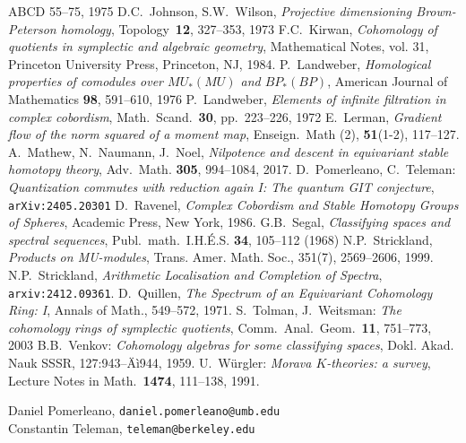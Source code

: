 \documentclass[11pt, reqno]{amsart}
\theoremstyle{plain}
\theoremstyle{definition}
\begin{document}
\begin{thebibliography}{ABCD}
	55--75, 1975
D.C.~Johnson, S.W.~Wilson, \emph{Projective dimensioning Brown-Peterson homology}, Topology~\textbf{12}, 327--353, 
1973
F.C.~Kirwan,  \emph{Cohomology of quotients in symplectic and algebraic geometry}, Mathematical
Notes, vol. 31, Princeton University Press, Princeton, NJ, 1984.
P.~Landweber, \emph{Homological properties of comodules over $MU_*(MU)$ and 
$BP_*(BP)$}, American Journal of Mathematics \textbf{98}, 591--610, 1976 
P.~Landweber, \emph{Elements of infinite filtration in complex cobordism}, 
Math.~Scand.~\textbf{30}, pp.~223--226, 1972 
E.~Lerman, \emph{Gradient flow of the norm squared of a moment map},  Enseign.~Math (2),  \textbf{51}(1-2),  117--127. 
A.~Mathew,  N.~Naumann,  J.~Noel,  \emph{Nilpotence and descent in equivariant stable homotopy theory},  Adv.~Math. 
\textbf{305}, 994--1084, 2017. 
D.~Pomerleano, C.~Teleman: \emph{Quantization commutes with reduction again I: The quantum GIT conjecture}, 
	\texttt{arXiv:2405.20301} 
D.~Ravenel,  \emph{Complex Cobordism and Stable Homotopy Groups of Spheres},  Academic Press, New York, 1986.
 G.B.~Segal, \emph{Classifying spaces and spectral sequences}, 
Publ.~math.~I.H.\'E.S. \textbf{34}, 105--112 (1968)
N.P.~Strickland,  \emph{Products on MU-modules}, Trans. Amer. Math. Soc., 351(7), 2569--2606, 1999.
N.P.~Strickland, \emph{Arithmetic Localisation and Completion of Spectra}, \texttt{arxiv:2412.09361}.
D.~Quillen,  \emph{The Spectrum of an Equivariant Cohomology Ring: I},  Annals of Math., 549--572,  1971.
S.~Tolman, J.~Weitsman: \emph{The cohomology rings of symplectic quotients}, Comm.~Anal.~Geom.~\textbf{11}, 
751--773, 2003
B.B.~Venkov: \emph{Cohomology algebras for some classifying spaces},  Dokl. Akad. Nauk SSSR, 127:943--Äì944, 1959.
U.~W{\"u}rgler:  \emph{Morava $K$-theories: a survey}, Lecture Notes in Math.~\textbf{1474}, 111--138, 1991.
\end{thebibliography}
\smallskip
\noindent
{\sc Daniel Pomerleano}, \texttt{daniel.pomerleano@umb.edu} 
\\
{\sc Constantin Teleman}, \texttt{teleman@berkeley.edu}
\end{document}
